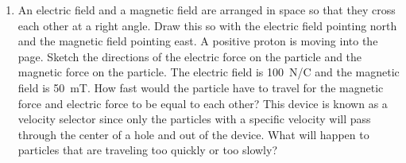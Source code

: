 \begin{enumerate}
\item
An electric field and a magnetic field are arranged in space so that they cross each other at a right angle. Draw this so with the electric field pointing north and the magnetic field pointing east. A positive proton is moving into the page. Sketch the directions of the electric force on the particle and the magnetic force on the particle. The electric field is \SI{100}{N/C} and the magnetic field is \SI{50}{\milli\tesla}. How fast would the particle have to travel for the magnetic force and electric force to be equal to each other? This device is known as a velocity selector since only the particles with a specific velocity will pass through the center of a hole and out of the device. What will happen to particles that are traveling too quickly or too slowly?




\newpage 

\ %

\newpage

\end{enumerate}